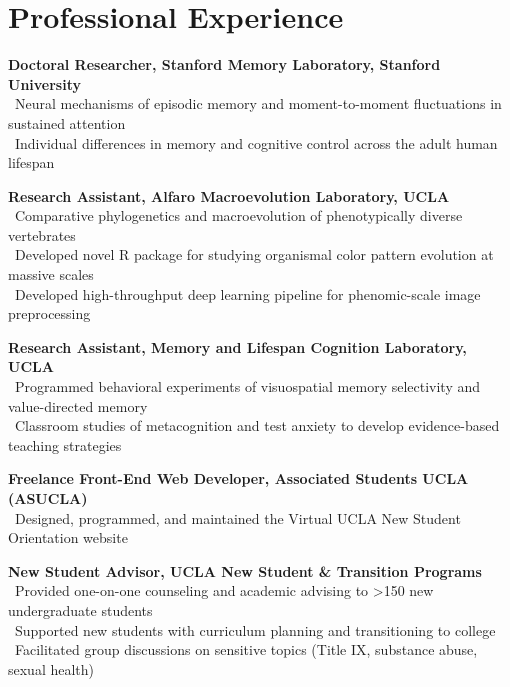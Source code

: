 \section*{Professional Experience}
\textbf{Doctoral Researcher, Stanford Memory Laboratory, Stanford University}\\
\textendash\ Neural mechanisms of episodic memory and moment-to-moment fluctuations in sustained attention\\
\textendash\ Individual differences in memory and cognitive control across the adult human lifespan

\pubspace

\textbf{Research Assistant, Alfaro Macroevolution Laboratory, UCLA}\\
\textendash\ Comparative phylogenetics and macroevolution of phenotypically diverse vertebrates\\
\textendash\ Developed novel R package for studying organismal color pattern evolution at massive scales\\
\textendash\ Developed high-throughput deep learning pipeline for phenomic-scale image preprocessing

\pubspace

\textbf{Research Assistant, Memory and Lifespan Cognition Laboratory, UCLA}\\
\textendash\ Programmed behavioral experiments of visuospatial memory selectivity and value-directed memory\\
\textendash\ Classroom studies of metacognition and test anxiety to develop evidence-based teaching strategies

\pubspace

\textbf{Freelance Front-End Web Developer, Associated Students UCLA (ASUCLA)}\\
\textendash\ Designed, programmed, and maintained the Virtual UCLA New Student Orientation website

\pubspace

\textbf{New Student Advisor, UCLA New Student \& Transition Programs}\\
\textendash\ Provided one-on-one counseling and academic advising to >150 new undergraduate students\\
\textendash\ Supported new students with curriculum planning and transitioning to college\\
\textendash\ Facilitated group discussions on sensitive topics (Title IX, substance abuse, sexual health)

